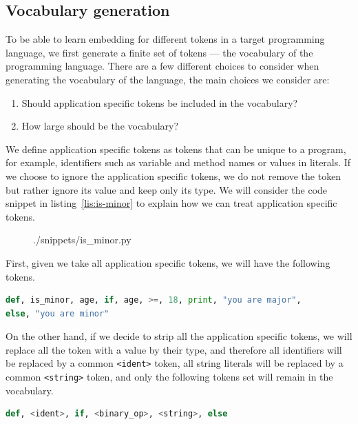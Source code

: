 \subsection{Vocabulary generation}
To be able to learn embedding for different tokens in a target programming
language, we first generate a finite set of tokens --- the vocabulary of the
programming language. There are a few different choices to consider when
generating the vocabulary of the language, the main choices we consider are:

\begin{enumerate}
\item Should application specific tokens be included in the vocabulary?
\item How large should be the vocabulary?
\end{enumerate}

We define application specific tokens as tokens that can be unique to a program,
for example, identifiers such as variable and method names or values in
literals.
If we choose to ignore the application specific tokens, we do not remove the
token but rather ignore its value and keep only its type.
We will consider the code snippet in listing~\ref{lis:is-minor} to explain how
we can treat application specific tokens.

\begin{figure}
  
    {./snippets/is_minor.py}
\end{figure}

First, given we take all application specific tokens, we will have the following
tokens.

\begin{lstlisting}[numbers=none,language=Python]
def, is_minor, age, if, age, >=, 18, print, "you are major",
else, "you are minor"
\end{lstlisting}

On the other hand, if we decide to strip all the application specific tokens, we
will replace all the token with a value by their type, and therefore all
identifiers will be replaced by a common \lstinline{<ident>} token, all string
literals will be replaced by a common \lstinline{<string>} token, and only the
following tokens set will remain in the vocabulary.

\begin{lstlisting}[numbers=none,language=Python]
def, <ident>, if, <binary_op>, <string>, else
\end{lstlisting}

